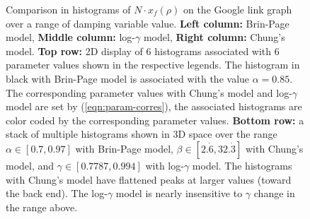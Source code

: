 \documentclass[conference]{IEEEtran}
\begin{document}
% 


\begin{figure}[!htb]
  \centering

  
  \caption{\footnotesize 
    Comparison in histograms of $N\cdot x_f(\rho)$ on the Google link
    graph over a range of damping variable value. 
    {\bf Left column:} Brin-Page model, 
    {\bf Middle column:} log-$\gamma$ model, 
    {\bf Right column:} Chung's model.
    {\bf Top row:} 2D display of 6 histograms associated with
    6 parameter values shown in the respective legends.  The
    histogram in black with Brin-Page model is associated with the value
    $\alpha = 0.85$.  The corresponding parameter values with Chung's
    model and log-$\gamma$ model are set by (\ref{eqn:param-corres}), 
    the associated histograms are color
    coded by the corresponding parameter values.
    {\bf Bottom row:} a stack of multiple histograms shown in 3D space over
    the range $\alpha \in [0.7, 0.97]$ with Brin-Page model,
    $\beta \in [2.\dot{6}, 32.\dot{3}] $ with Chung's model, and $\gamma \in [0.7787,0.994]$ with log-$\gamma$ model. The histograms with Chung's
    model have flattened peaks at larger values (toward the back
    end). The log-$\gamma$ model is nearly insensitive to $\gamma$ change in the range above.}  %
\label{fig:histogram-google}
\end{figure}

\end{document}
